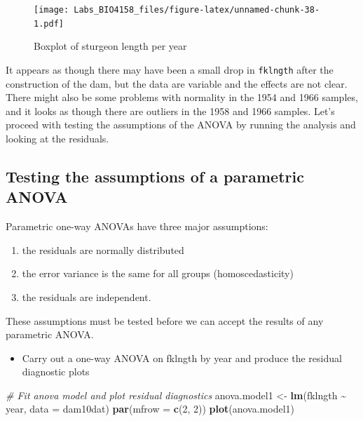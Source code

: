 \documentclass[
  12pt,
]{book}
\newenvironment{Shaded}{\begin{snugshade}}{\end{snugshade}}
\newcommand{\CommentTok}[1]{\textcolor[rgb]{0.56,0.35,0.01}{\textit{#1}}}
\newcommand{\DataTypeTok}[1]{\textcolor[rgb]{0.13,0.29,0.53}{#1}}
\newcommand{\DecValTok}[1]{\textcolor[rgb]{0.00,0.00,0.81}{#1}}
\newcommand{\KeywordTok}[1]{\textcolor[rgb]{0.13,0.29,0.53}{\textbf{#1}}}
\newcommand{\NormalTok}[1]{#1}
\newcommand{\OperatorTok}[1]{\textcolor[rgb]{0.81,0.36,0.00}{\textbf{#1}}}
\newcommand{\StringTok}[1]{\textcolor[rgb]{0.31,0.60,0.02}{#1}}
\providecommand{\tightlist}{%
  \setlength{\itemsep}{0pt}\setlength{\parskip}{0pt}}
\begin{document}
\begin{figure}
\centering
\texttt{[image: Labs\_BIO4158\_files/figure-latex/unnamed-chunk-38-1.pdf]}
\caption{\label{fig:unnamed-chunk-38}Boxplot of sturgeon length per year}
\end{figure}

It appears as though there may have been a small drop in \texttt{fklngth} after the construction of the dam, but the data are variable and the effects are not clear. There might also be some problems with normality in the 1954 and 1966 samples, and it looks as though there are outliers in the 1958 and 1966 samples. Let's proceed with testing the assumptions of the ANOVA by running the analysis and looking at the residuals.

\hypertarget{testing-the-assumptions-of-a-parametric-anova}{%
\subsection{Testing the assumptions of a parametric ANOVA}\label{testing-the-assumptions-of-a-parametric-anova}}

Parametric one-way ANOVAs have three major assumptions:

\begin{enumerate}
\def\labelenumi{\arabic{enumi}.}
\tightlist
\item
  the residuals are normally distributed
\item
  the error variance is the same for all groups (homoscedasticity)
\item
  the residuals are independent.
\end{enumerate}

These assumptions must be tested before we can accept the results of any parametric ANOVA.

\begin{itemize}
\tightlist
\item
  Carry out a one-way ANOVA on fklngth by year and produce the residual diagnostic plots
\end{itemize}

\begin{Shaded}
\begin{Highlighting}[]
\CommentTok{\# Fit anova model and plot residual diagnostics}
\NormalTok{anova.model1 \textless{}{-}}\StringTok{ }\KeywordTok{lm}\NormalTok{(fklngth }\OperatorTok{\textasciitilde{}}\StringTok{ }\NormalTok{year, }\DataTypeTok{data =}\NormalTok{ dam10dat)}
\KeywordTok{par}\NormalTok{(}\DataTypeTok{mfrow =} \KeywordTok{c}\NormalTok{(}\DecValTok{2}\NormalTok{, }\DecValTok{2}\NormalTok{))}
\KeywordTok{plot}\NormalTok{(anova.model1)}
\end{Highlighting}
\end{Shaded}
\end{document}
